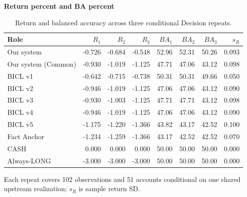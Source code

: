 \begin{table}[htb]
\centering\small
\setlength{\tabcolsep}{3pt}
\renewcommand{\arraystretch}{1.12}
\caption{Return and balanced accuracy across three conditional Decision repeats.}
\label{tab:u09-repeats}
\textbf{Return percent and BA percent}\par\smallskip
\begin{tabular}{lrrrrrrr}
\hline
Role & $R_1$ & $R_2$ & $R_3$ & $BA_1$ & $BA_2$ & $BA_3$ & $s_R$ \\
\hline
Our system & -0.726 & -0.684 & -0.548 & 52.96 & 52.31 & 50.26 & 0.093 \\
Our system (Common) & -0.930 & -1.019 & -1.125 & 47.71 & 47.06 & 43.12 & 0.098 \\
BICL v1 & -0.642 & -0.715 & -0.738 & 50.31 & 50.31 & 49.66 & 0.050 \\
BICL v2 & -0.946 & -1.019 & -1.125 & 47.06 & 47.06 & 43.12 & 0.090 \\
BICL v3 & -0.930 & -1.003 & -1.125 & 47.71 & 47.71 & 43.12 & 0.098 \\
BICL v4 & -0.946 & -1.019 & -1.125 & 47.06 & 47.06 & 43.12 & 0.090 \\
BICL v5 & -1.175 & -1.220 & -1.366 & 43.82 & 43.17 & 42.52 & 0.100 \\
Fact Anchor & -1.234 & -1.259 & -1.366 & 43.17 & 42.52 & 42.52 & 0.070 \\
CASH & 0.000 & 0.000 & 0.000 & 50.00 & 50.00 & 50.00 & 0.000 \\
Always-LONG & -3.000 & -3.000 & -3.000 & 50.00 & 50.00 & 50.00 & 0.000 \\
\hline
\end{tabular}\par\medskip
\begin{minipage}{\textwidth}\footnotesize Each repeat covers 102 observations and 51 accounts conditional on one shared upstream realization; $s_R$ is sample return SD.\end{minipage}
\end{table}

